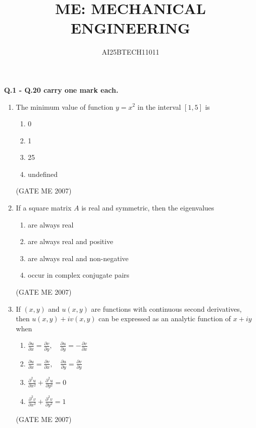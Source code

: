 \documentclass[journal]{IEEEtran}
\begin{document}
\title{
ME: MECHANICAL ENGINEERING}
\author{AI25BTECH11011}
\maketitle
\renewcommand{\thefigure}{\theenumi}
\renewcommand{\thetable}{\theenumi}

\textbf{Q.1 - Q.20 carry one mark each.}

\begin{enumerate}

\item The minimum value of function $ y = x^2 $ in the interval $[1,5]$ is
\begin{multicols}{4}
\begin{enumerate}
\item 0
\item 1
\item 25
\item undefined
\end{enumerate}
\end{multicols}
\hfill (GATE ME 2007)

\item If a square matrix $ A $ is real and symmetric, then the eigenvalues
\begin{multicols}{2}
\begin{enumerate}
\item are always real
\item are always real and positive
\item are always real and non-negative
\item occur in complex conjugate pairs
\end{enumerate}
\end{multicols}
\hfill (GATE ME 2007)

\item If $ (x, y) $ and $ u(x, y) $ are functions with continuous second derivatives, then $ u(x, y) + iv(x, y) $ can be expressed as an analytic function of $ x + iy $ when
\begin{enumerate}
\item $ \frac{\partial u}{\partial x} = \frac{\partial v}{\partial y}, \quad \frac{\partial u}{\partial y} = -\frac{\partial v}{\partial x} $
\item $ \frac{\partial u}{\partial x} = \frac{\partial v}{\partial x}, \quad \frac{\partial u}{\partial y} = \frac{\partial v}{\partial y} $
\item $ \frac{\partial^2 u}{\partial x^2} + \frac{\partial^2 u}{\partial y^2} = 0 $
\item $ \frac{\partial^2 v}{\partial x^2} + \frac{\partial^2 v}{\partial y^2} = 1 $
\end{enumerate}
\hfill (GATE ME 2007)


\end{enumerate}
\end{document}
